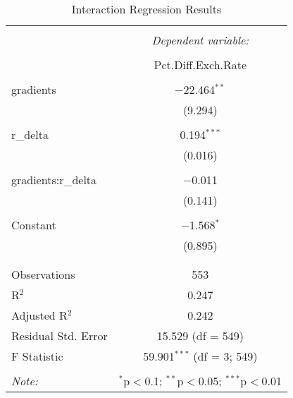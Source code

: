 
\begin{table}[!htbp] \centering 
  \caption{Interaction Regression Results} 
  \label{tab:regression} 
\begin{tabular}{@{\extracolsep{5pt}}lc} 
\\[-1.8ex]\hline 
\hline \\[-1.8ex] 
 & \multicolumn{1}{c}{\textit{Dependent variable:}} \\ 
\cline{2-2} 
\\[-1.8ex] & Pct.Diff.Exch.Rate \\ 
\hline \\[-1.8ex] 
 gradients & $-$22.464$^{**}$ \\ 
  & (9.294) \\ 
  & \\ 
 r\_delta & 0.194$^{***}$ \\ 
  & (0.016) \\ 
  & \\ 
 gradients:r\_delta & $-$0.011 \\ 
  & (0.141) \\ 
  & \\ 
 Constant & $-$1.568$^{*}$ \\ 
  & (0.895) \\ 
  & \\ 
\hline \\[-1.8ex] 
Observations & 553 \\ 
R$^{2}$ & 0.247 \\ 
Adjusted R$^{2}$ & 0.242 \\ 
Residual Std. Error & 15.529 (df = 549) \\ 
F Statistic & 59.901$^{***}$ (df = 3; 549) \\ 
\hline 
\hline \\[-1.8ex] 
\textit{Note:}  & \multicolumn{1}{r}{$^{*}$p$<$0.1; $^{**}$p$<$0.05; $^{***}$p$<$0.01} \\ 
\end{tabular} 
\end{table} 
